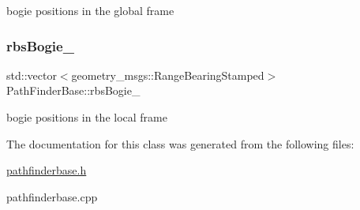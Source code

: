 bogie positions in the global frame \mbox{\label{classPathFinderBase_a21b832ada9734a1edc08c990f69ac9d9}} 
\subsubsection{\texorpdfstring{rbs\+Bogie\+\_\+}{rbsBogie\_}}
{\footnotesize\ttfamily std\+::vector$<$geometry\+\_\+msgs\+::\+Range\+Bearing\+Stamped$>$ Path\+Finder\+Base\+::rbs\+Bogie\+\_\+\hspace{0.3cm}{\ttfamily [protected]}}

bogie positions in the local frame 

The documentation for this class was generated from the following files\+:\begin{DoxyCompactItemize}
\item 
\hyperlink{pathfinderbase_8h}{pathfinderbase.\+h}\item 
pathfinderbase.\+cpp\end{DoxyCompactItemize}
